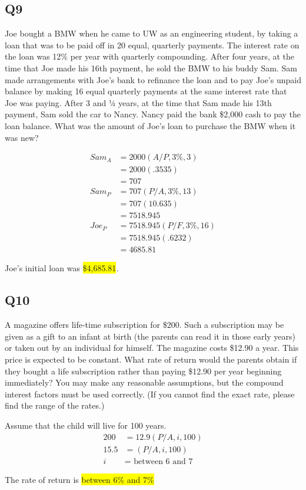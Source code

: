 \documentclass[12pt]{article}
\newcommand{\hilight}[1]{\colorbox{yellow}{#1}}
\begin{document}
\subsection*{Q9}
Joe bought a BMW when he came to UW as an engineering student, by taking a loan
that was to be paid off in 20 equal, quarterly payments. The interest rate on the loan was 12\% per year with quarterly compounding. After four years, at the time that Joe made his 16th payment, he sold the BMW to his buddy Sam. Sam made arrangements with Joe's bank to refinance the loan and to pay Joe's unpaid balance by making 16 equal quarterly payments at the same interest rate that Joe was paying. After 3 and 1⁄4
years, at the time that Sam made his 13th payment, Sam sold the car to Nancy.
Nancy paid the bank \$2,000 cash to pay the loan balance. What was the amount of Joe's loan to purchase the BMW when it was new?

\begin{align*}
Sam_A &= 2000(A/P, 3\%, 3)\\
&=2000(.3535)\\
&= 707\\
Sam_P &= 707(P/A, 3\%, 13)\\
&= 707(10.635)\\
&= 7518.945\\
Joe_P &= 7518.945(P/F, 3\%, 16)\\
&= 7518.945(.6232)\\
&=4685.81
\end{align*}

Joe's initial loan was \hilight{\$4,685.81}.

\subsection*{Q10}
A magazine offers life-time subscription for \$200. Such a subscription may be given
as a gift to an infant at birth (the parents can read it in those early years) or taken out by an individual for himself. The magazine costs \$12.90 a year. This price is expected to be constant. What rate of return would the parents obtain if they bought a life subscription rather than paying \$12.90 per year beginning immediately? You may make any reasonable assumptions, but the compound interest factors must be used correctly. (If you cannot find the exact rate, please find the range of the rates.)

Assume that the child will live for 100 years.
\begin{align*}
200 &= 12.9(P/A, i, 100)\\
15.5 &= (P/A, i, 100)\\
i &= \text{ between 6 and 7}
\end{align*}

The rate of return is \hilight{between 6\% and 7\%}
\end{document}

